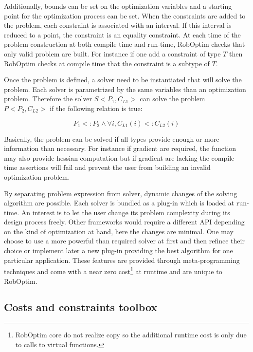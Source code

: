 \documentclass[conference,final,a4paper,twocolumn,9pt]{IEEEtran}
\begin{document}
Additionally, bounds can be set on the optimization variables and a
starting point for the optimization process can be set. When the
constraints are added to the problem, each constraint is associated
with an interval. If this interval is reduced to a point, the
constraint is an equality constraint. At each time of the problem
construction at both compile time and run-time, RobOptim checks that
only valid problem are built. For instance if one add a constraint of
type $T$ then RobOptim checks at compile time that the constraint is a
subtype of $T$.


Once the problem is defined, a solver need to be instantiated that
will solve the problem. Each solver is parametrized by the same
variables than an optimization problem. Therefore the solver
$S<P_1,C_{L1}>$ can solve the problem $P<P_2,C_{L2}>$ if the following
relation is true:


\begin{equation}
  P_1 <: P_2 \wedge \forall i, C_{L1}(i) <: C_{L2}(i)
\end{equation}


Basically, the problem can be solved if all types provide enough or
more information than necessary. For instance if gradient are
required, the function may also provide hessian computation but if
gradient are lacking the compile time assertions will fail and prevent
the user from building an invalid optimization problem.

By separating problem expression from solver, dynamic changes of the
solving algorithm are possible. Each solver is bundled as a plug-in
which is loaded at run-time. An interest is to let the user change its
problem complexity during its design process freely. Other frameworks
would require a different API depending on the kind of optimization at
hand, here the changes are minimal. One may choose to use a more
powerful than required solver at first and then refince their choice
or implement later a new plug-in providing the best algorithm for one
particular application. These features are provided through
meta-programming techniques and come with a near zero
cost\footnote{RobOptim core do not realize copy so the additional
  runtime cost is only due to calls to virtual functions.} at runtime
and are unique to RobOptim.

\subsection{Costs and constraints toolbox}
\end{document}
